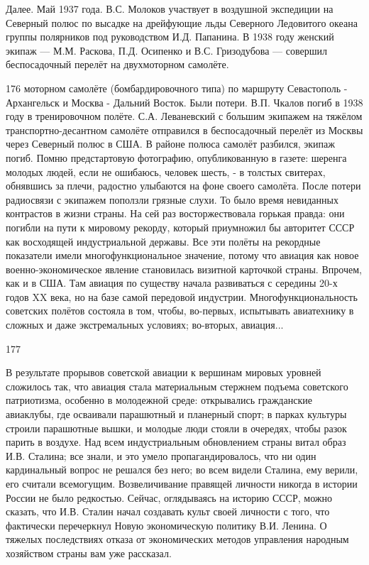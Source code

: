 Далее. Май 1937 года. В.С. Молоков участвует в воздушной экспедиции на Северный полюс по высадке на дрейфующие льды Северного Ледовитого океана группы полярников под руководством И.Д. Папанина. В 1938 году женский экипаж — М.М. Раскова, П.Д. Осипенко и В.С. Гризодубова — совершил беспосадочный перелёт на двухмоторном самолёте.

176
моторном самолёте (бомбардировочного типа) по маршруту Севастополь - Архангельск и Москва - Дальний Восток. Были потери. В.П. Чкалов погиб в 1938 году в тренировочном полёте. С.А. Леваневский с большим экипажем на тяжёлом транспортно-десантном самолёте отправился в беспосадочный перелёт из Москвы через Северный полюс в США. В районе полюса самолёт разбился, экипаж погиб.
Помню предстартовую фотографию, опубликованную в газете: шеренга молодых людей, если не ошибаюсь, человек шесть, - в толстых свитерах, обнявшись за плечи, радостно улыбаются на фоне своего самолёта. После потери радиосвязи с экипажем поползли грязные слухи. То было время невиданных контрастов в жизни страны. На сей раз восторжествовала горькая правда: они погибли на пути к мировому рекорду, который приумножил бы авторитет СССР как восходящей индустриальной державы.
Все эти полёты на рекордные показатели имели многофункциональное значение, потому что авиация как новое военно-экономическое явление становилась визитной карточкой страны. Впрочем, как и в США. Там авиация по существу начала развиваться с середины 20-х годов XX века, но на базе самой передовой индустрии. Многофункциональность советских полётов состояла в том, чтобы, во-первых, испытывать авиатехнику в сложных и даже экстремальных условиях; во-вторых, авиация...

177

В результате прорывов советской авиации к вершинам мировых уровней сложилось так, что авиация стала материальным стержнем подъема советского патриотизма, особенно в молодежной среде: открывались гражданские авиаклубы, где осваивали парашютный и планерный спорт; в парках культуры строили парашютные вышки, и молодые люди стояли в очередях, чтобы разок парить в воздухе. Над всем индустриальным обновлением страны витал образ И.В. Сталина; все знали, и это умело пропагандировалось, что ни один кардинальный вопрос не решался без него; во всем видели Сталина, ему верили, его считали всемогущим. Возвеличивание правящей личности никогда в истории России не было редкостью. Сейчас, оглядываясь на историю СССР, можно сказать, что И.В. Сталин начал создавать культ своей личности с того, что фактически перечеркнул Новую экономическую политику В.И. Ленина. О тяжелых последствиях отказа от экономических методов управления народным хозяйством страны вам уже рассказал.

